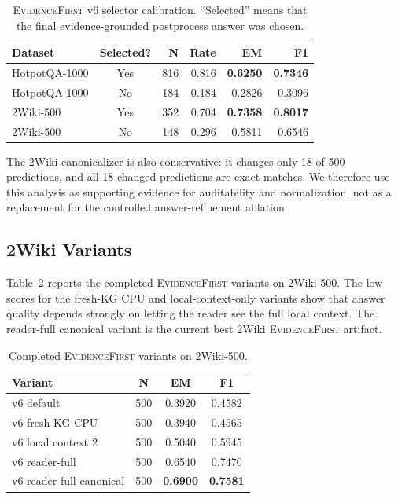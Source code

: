 \documentclass[runningheads]{llncs}
\newcommand{\sys}{\textsc{EvidenceFirst}\xspace}
\begin{document}
\begin{table}[t]
\centering
\caption{\sys v6 selector calibration. ``Selected'' means that the final
evidence-grounded postprocess answer was chosen.}
\label{tab:selector_calibration}
\small
\begin{tabular}{lcrrrr}
\toprule
Dataset & Selected? & N & Rate & EM & F1 \\
\midrule
HotpotQA-1000 & Yes & 816 & 0.816 & \textbf{0.6250} & \textbf{0.7346} \\
HotpotQA-1000 & No & 184 & 0.184 & 0.2826 & 0.3096 \\
2Wiki-500 & Yes & 352 & 0.704 & \textbf{0.7358} & \textbf{0.8017} \\
2Wiki-500 & No & 148 & 0.296 & 0.5811 & 0.6546 \\
\bottomrule
\end{tabular}
\end{table}

The 2Wiki canonicalizer is also conservative: it changes only 18 of 500
predictions, and all 18 changed predictions are exact matches. We therefore use
this analysis as supporting evidence for auditability and normalization, not as
a replacement for the controlled answer-refinement ablation.

\subsection{2Wiki Variants}

Table~\ref{tab:2wiki_variants} reports the completed \sys variants on
2Wiki-500. The low scores for the fresh-KG CPU and local-context-only variants
show that answer quality depends strongly on letting the reader see the full
local context. The reader-full canonical variant is the current best 2Wiki
\sys artifact.

\begin{table}[t]
\centering
\caption{Completed \sys variants on 2Wiki-500.}
\label{tab:2wiki_variants}
\small
\begin{tabular}{lccc}
\toprule
Variant & N & EM & F1 \\
\midrule
v6 default & 500 & 0.3920 & 0.4582 \\
v6 fresh KG CPU & 500 & 0.3940 & 0.4565 \\
v6 local context 2 & 500 & 0.5040 & 0.5945 \\
v6 reader-full & 500 & 0.6540 & 0.7470 \\
v6 reader-full canonical & 500 & \textbf{0.6900} & \textbf{0.7581} \\
\bottomrule
\end{tabular}
\end{table}
\end{document}
